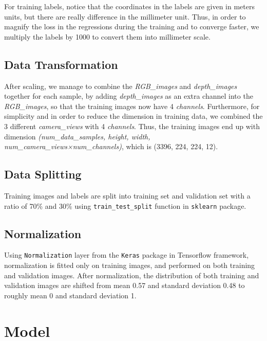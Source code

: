 \documentclass[11pt]{article}
\begin{document}
For training labels, notice that the coordinates in the labels are given
in meters units, but there are really difference in the millimeter unit.
Thus, in order to magnify the loss in the regressions during the
training and to converge faster, we multiply the labels by 1000 to
convert them into millimeter scale.

    \hypertarget{data-transformation}{%
\subsection{Data Transformation}\label{data-transformation}}

After scaling, we manage to combine the \emph{RGB\_images} and
\emph{depth\_images} together for each sample, by adding
\emph{depth\_images} as an extra channel into the \emph{RGB\_images}, so
that the training images now have 4 \emph{channels}. Furthermore, for
simplicity and in order to reduce the dimension in training data, we
combined the 3 different \emph{camera\_views} with 4 \emph{channels}.
Thus, the training images end up with dimension
\emph{(num\_data\_samples, height, width,
num\_camera\_views×num\_channels)}, which is (3396, 224, 224, 12).

    \hypertarget{data-splitting}{%
\subsection{Data Splitting}\label{data-splitting}}

Training images and labels are split into training set and validation
set with a ratio of 70\% and 30\% using \texttt{train\_test\_split}
function in \texttt{sklearn} package.

    \hypertarget{normalization}{%
\subsection{Normalization}\label{normalization}}

Using \texttt{Normalization} layer from the \texttt{Keras} package in
Tensorflow framework, normalization is fitted only on training images,
and performed on both training and validation images. After
normalization, the distribution of both training and validation images
are shifted from mean 0.57 and standard deviation 0.48 to roughly mean 0
and standard deviation 1.

    \hypertarget{model}{%
\section{Model}\label{model}}
\end{document}
